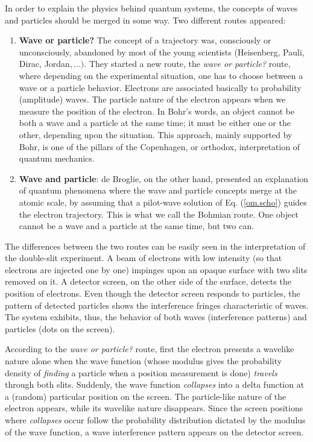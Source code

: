 \documentclass[onecolumn,nofootinbib, secnumarabic, amsmath, nobibnotes,12pt,aps,pra]{revtex4-1}
\newcommand{\eref}[1]{Eq. (\ref{#1})}
\begin{document}
In order to  explain the
physics behind quantum systems, the concepts of waves and particles
should be merged in some way. Two different routes appeared:
\begin{enumerate}
\item \textbf{Wave or particle?} The concept of a trajectory was, consciously or unconsciously, abandoned by most of the young scientists (Heisenberg, Pauli, Dirac, Jordan$,\ldots).$ They started a new route, the \textit{wave or particle?} route, where depending on the experimental situation, one has to choose between a wave or a particle behavior. Electrons are associated basically to probability (amplitude) waves. The particle nature of the electron appears when we measure the position of the electron. In Bohr's words, an object cannot be both a wave and a particle at the same time; it must be either one or the other, depending upon the situation. This approach, mainly supported by Bohr, is one of the pillars of the Copenhagen, or orthodox, interpretation of quantum mechanics.

\item \textbf{Wave and particle}: de Broglie, on the other hand, presented an explanation of quantum phenomena where the wave and particle concepts merge at the atomic scale, by assuming that a pilot-wave solution of \eref{om.scho} guides the electron trajectory. This is what we call the Bohmian route. One object cannot be a wave and a particle at the same time, but two can.
\end{enumerate}

The differences between the two routes can be easily seen in the
interpretation of the double-slit experiment. A beam of electrons
with low intensity (so that electrons are injected one by one)
impinges upon an opaque surface with two slits removed on it. A
detector screen, on the other side of the surface, detects the
position of electrons. Even though the detector screen responds to
particles, the pattern of detected particles shows the interference
fringes characteristic of waves. The system exhibits, thus, the
behavior of both waves (interference patterns) and particles (dots
on the screen).

According to the \textit{wave or particle?} route, first the electron presents a wavelike nature alone when the wave function (whose modulus gives the probability density of \textit{finding} a particle when a position measurement is done) \textit{travels} through both slits. Suddenly, the wave function \textit{collapses} into a delta function at a (random) particular position on the screen. The particle-like nature of the electron appears, while its wavelike nature disappears. Since the screen positions where \textit{collapses} occur follow the probability distribution dictated by the modulus of the wave function, a wave interference pattern appears on the detector screen.
\end{document}
